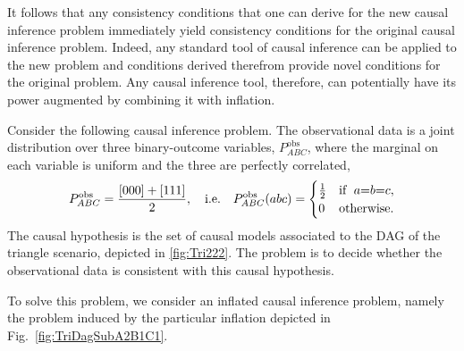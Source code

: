 It follows that any consistency conditions that one can derive for the new causal inference problem immediately yield consistency conditions for the original causal inference problem.  Indeed, any standard tool of causal inference can be applied to the new problem and conditions derived therefrom provide novel conditions for the original problem.  Any causal inference tool, therefore, can potentially have its power augmented by combining it with inflation.



\par\smallskip\nobreak

Consider the following causal inference problem.  The observational data is a joint distribution over three binary-outcome variables, $P^{\text{obs}}_{A B C}$, where the marginal on each variable is uniform and the three are perfectly correlated,
\begin{align}\label{eq:ghzdistribution1}
P^{\text{obs}}_{A B C}=\frac{[000]+[111]}{2},\quad\text{i.e.}\quad P^{\text{obs}}_{A B C}(a b c)=\begin{cases}\tfrac{1}{2}&\text{if }\; a\mathord{=} b\mathord{=} c, \\ 0&\text{otherwise}.\end{cases}
\end{align}
The causal hypothesis is the set of causal models associated to the DAG of the triangle scenario, depicted in \cref{fig:Tri222}.  The problem is to decide whether the observational data is consistent with this causal hypothesis.

To solve this problem, we consider an inflated causal inference problem, namely the problem induced by the particular inflation depicted in Fig.~\ref{fig:TriDagSubA2B1C1}.  

